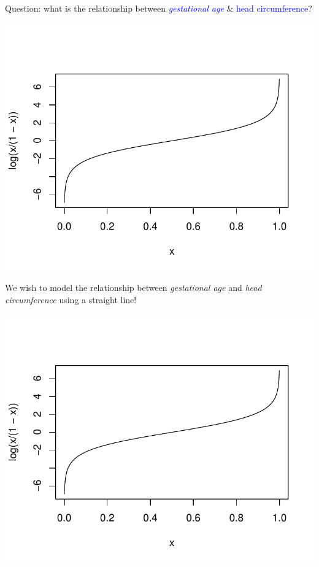 \documentclass{article}\usepackage[]{graphicx}\usepackage[svgnames]{xcolor}
\makeatletter
\def\maxwidth{ %
  \ifdim\Gin@nat@width>\linewidth
    \linewidth
  \else
    \Gin@nat@width
  \fi
}
\newenvironment{knitrout}{}{} %
\makeatother
\begin{document}
Question: what is the relationship between \textcolor{Blue}{\emph{gestational age}} \& \textcolor{Blue}{head circumference}?
\begin{knitrout}
\color{fgcolor}

{\centering \includegraphics[width=\maxwidth]{figure/unnamed-chunk-17-1} 

}


\end{knitrout}
We wish to model the relationship between \emph{gestational age} and \emph{head
      circumference} using a straight line!
\begin{knitrout}
\color{fgcolor}

{\centering \includegraphics[width=\maxwidth]{figure/unnamed-chunk-18-1} 

}


\end{knitrout}
\end{document}
